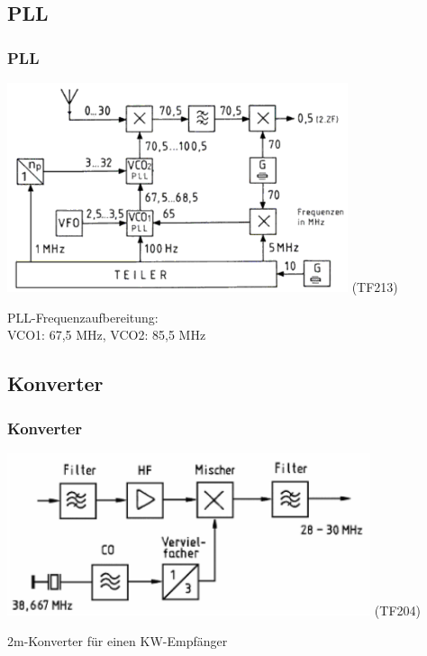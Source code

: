 \subsection{PLL}

\begin{frame}
    \frametitle{PLL}

    \begin{center}
        \includegraphics[width=0.75\textwidth]{a13/TF213.png}
        \tiny (TF213)
    \end{center}

    PLL-Frequenzaufbereitung: \\
    VCO1: 67,5 MHz, VCO2: 85,5 MHz

\end{frame}

\subsection{Konverter}

\begin{frame}
    \frametitle{Konverter}

    \begin{center}
        \includegraphics[width=0.8\textwidth]{a13/TF204.png}
        \tiny (TF204)
    \end{center}

    2m-Konverter für einen KW-Empfänger

\end{frame}

